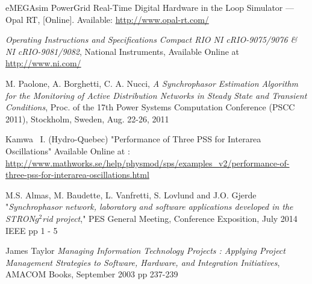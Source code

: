 \documentclass[conference]{IEEEtran}
\begin{document}
\begin{thebibliography}{1}
 eMEGAsim PowerGrid Real-Time Digital Hardware in the Loop Simulator — Opal RT, [Online]. Available: \url{http://www.opal-rt.com/}

 \emph{Operating Instructions and Specifications Compact RIO NI cRIO-9075/9076 \& NI cRIO-9081/9082}, National Instruments, Available Online at \url{http://www.ni.com/}

 M. Paolone, A. Borghetti, C. A. Nucci, \emph{A Synchrophasor Estimation Algorithm for the Monitoring of Active Distribution Networks in Steady State and Transient Conditions}, Proc. of the 17th Power Systems Computation Conference (PSCC 2011), Stockholm, Sweden, Aug. 22-26, 2011 

 Kamwa \ I. (Hydro-Quebec) "Performance of Three PSS for Interarea Oscillations" Available Online at : \url{http://www.mathworks.se/help/physmod/sps/examples_v2/performance-of-three-pss-for-interarea-oscillations.html}



 M.S. Almas, M. Baudette, L. Vanfretti, S. Lovlund and J.O. Gjerde "\emph{Synchrophasor network, laboratory and software applications developed in the STRON$g^{2}$rid project}," PES General Meeting, Conference Exposition, July 2014 IEEE pp 1 - 5

 James Taylor \emph{Managing Information Technology Projects : Applying Project Management Strategies to Software, Hardware, and Integration Initiatives}, AMACOM Books, September 2003 pp 237-239




\end{thebibliography}
\end{document}

